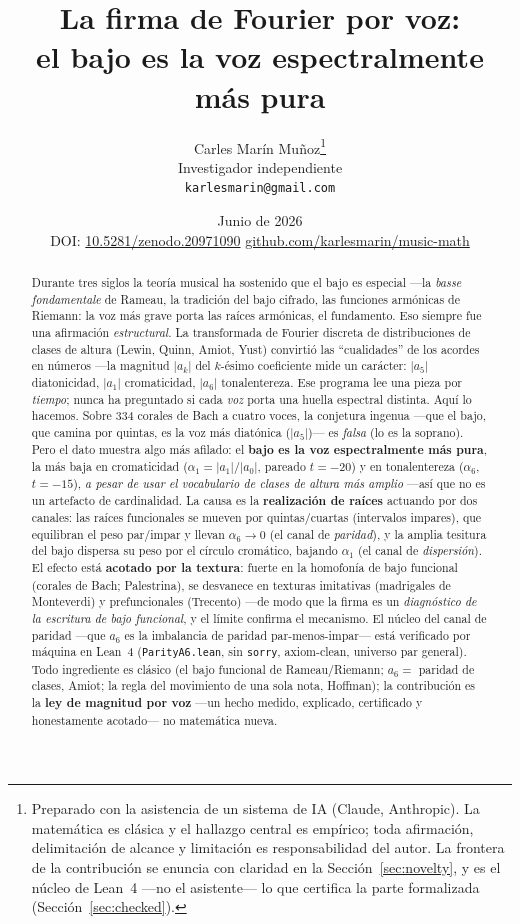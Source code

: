\documentclass[11pt]{article}
\title{\bf La firma de Fourier por voz:\\ el bajo es la voz espectralmente más pura}
\author{Carles Mar\'in Mu\~noz\thanks{Preparado con la asistencia de un sistema de IA (Claude, Anthropic).
La matemática es clásica y el hallazgo central es empírico; toda afirmación, delimitación de alcance y
limitación es responsabilidad del autor. La frontera de la contribución se enuncia con claridad en la
Sección~\ref{sec:novelty}, y es el núcleo de Lean~4 ---no el asistente--- lo que certifica la parte
formalizada (Sección~\ref{sec:checked}).}\\[3pt]
  \normalsize Investigador independiente\\
  \normalsize \texttt{karlesmarin@gmail.com}}
\date{Junio de 2026\\[3pt]\normalsize DOI: \href{https://doi.org/10.5281/zenodo.20971090}{10.5281/zenodo.20971090}
\quad\textbullet\quad \href{https://github.com/karlesmarin/music-math}{github.com/karlesmarin/music-math}}
\newcommand{\lean}[1]{\texttt{#1}}
\begin{document}
\maketitle

\begin{abstract}\noindent
Durante tres siglos la teoría musical ha sostenido que el bajo es especial ---la \emph{basse fondamentale}
de Rameau, la tradición del bajo cifrado, las funciones armónicas de Riemann: la voz más grave porta las
raíces armónicas, el fundamento. Eso siempre fue una afirmación \emph{estructural}. La transformada de
Fourier discreta de distribuciones de clases de altura (Lewin, Quinn, Amiot, Yust) convirtió las
``cualidades'' de los acordes en números ---la magnitud $|a_k|$ del $k$-ésimo coeficiente mide un carácter:
$|a_5|$ diatonicidad, $|a_1|$ cromaticidad, $|a_6|$ tonalentereza. Ese programa lee una pieza por
\emph{tiempo}; nunca ha preguntado si cada \emph{voz} porta una huella espectral distinta. Aquí lo hacemos.
Sobre $334$ corales de Bach a cuatro voces, la conjetura ingenua ---que el bajo, que camina por quintas, es
la voz más diatónica ($|a_5|$)--- es \emph{falsa} (lo es la soprano). Pero el dato muestra algo más
afilado: el \textbf{bajo es la voz espectralmente más pura}, la más baja en cromaticidad
($\alpha_1=|a_1|/|a_0|$, pareado $t=-20$) y en tonalentereza ($\alpha_6$, $t=-15$), \emph{a pesar de usar
el vocabulario de clases de altura más amplio} ---así que no es un artefacto de cardinalidad. La causa es
la \textbf{realización de raíces} actuando por dos canales: las raíces funcionales se mueven por
quintas/cuartas (intervalos impares), que equilibran el peso par/impar y llevan $\alpha_6\!\to\!0$ (el
canal de \emph{paridad}), y la amplia tesitura del bajo dispersa su peso por el círculo cromático, bajando
$\alpha_1$ (el canal de \emph{dispersión}). El efecto está \textbf{acotado por la textura}: fuerte en la
homofonía de bajo funcional (corales de Bach; Palestrina), se desvanece en texturas imitativas (madrigales
de Monteverdi) y prefuncionales (Trecento) ---de modo que la firma es un \emph{diagnóstico de la escritura
de bajo funcional}, y el límite confirma el mecanismo. El núcleo del canal de paridad ---que $a_6$ es la
imbalancia de paridad par-menos-impar--- está verificado por máquina en Lean~4 (\lean{ParityA6.lean},
sin \lean{sorry}, axiom-clean, universo par general). Todo ingrediente es clásico (el bajo funcional de
Rameau/Riemann; $a_6=$ paridad de clases, Amiot; la regla del movimiento de una sola nota, Hoffman); la
contribución es la \textbf{ley de magnitud por voz} ---un hecho medido, explicado, certificado y
honestamente acotado--- no matemática nueva.
\end{abstract}
\end{document}
